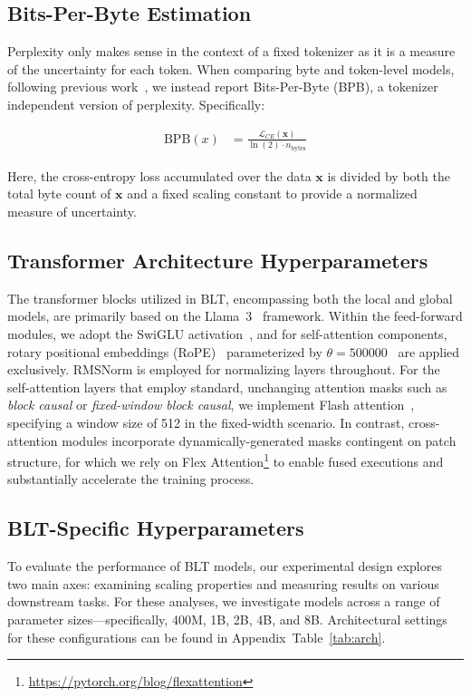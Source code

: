 \subsection{Bits-Per-Byte Estimation} Perplexity only makes sense in the context of a fixed tokenizer as it is a measure of the uncertainty for each token. When comparing byte and token-level models, following previous work~\citep{xue2022byt5, yu2023megabyte, wang2024mambabyte}, we instead report Bits-Per-Byte (BPB), a tokenizer independent version of perplexity. Specifically:

\begin{align}
    \text{BPB}(x)&= \frac{\mathcal{L}_{CE}(\pmb{x})}{\ln(2)\cdot n_{\text{bytes}}}
\end{align}

Here, the cross-entropy loss accumulated over the data $\pmb{x}$ is divided by both the total byte count of $\pmb{x}$ and a fixed scaling constant to provide a normalized measure of uncertainty.

\subsection{Transformer Architecture Hyperparameters} The transformer blocks utilized in {\textsc BLT}, encompassing both the local and global models, are primarily based on the Llama~3~\citep{dubey2024llama} framework. Within the feed-forward modules, we adopt the SwiGLU activation~\citep{swiglu}, and for self-attention components, rotary positional embeddings (RoPE)~\citep{RoPe} parameterized by $\theta=500000$~\citep{xiong2024effective} are applied exclusively. RMSNorm \citep{RMSNorm} is employed for normalizing layers throughout. For the self-attention layers that employ standard, unchanging attention masks such as \textit{block causal} or \textit{fixed-window block causal}, we implement Flash attention~\citep{dao2022flashattention}, specifying a window size of 512 in the fixed-width scenario. In contrast, cross-attention modules incorporate dynamically-generated masks contingent on patch structure, for which we rely on Flex Attention\footnote{\url{https://pytorch.org/blog/flexattention}} to enable fused executions and substantially accelerate the training process.

\subsection{{\textsc BLT}-Specific Hyperparameters}

To evaluate the performance of {\textsc BLT} models, our experimental design explores two main axes: examining scaling properties and measuring results on various downstream tasks. For these analyses, we investigate models across a range of parameter sizes—specifically, 400M, 1B, 2B, 4B, and 8B. Architectural settings for these configurations can be found in Appendix~Table~\ref{tab:arch}.

